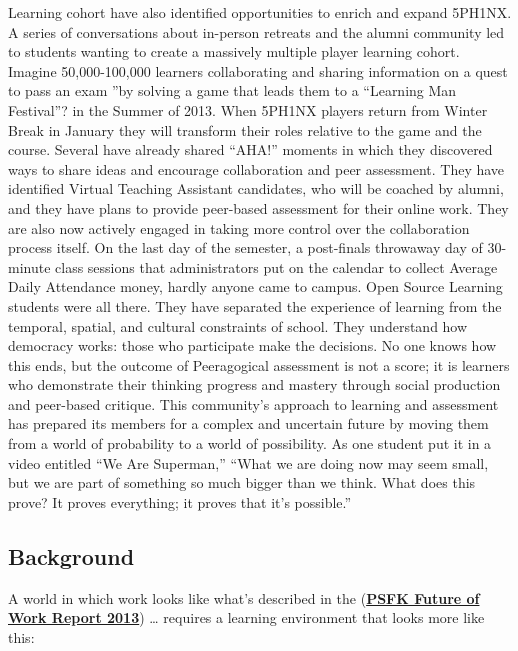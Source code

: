 Learning cohort have also identified opportunities to enrich and expand
5PH1NX. A series of conversations about in-person retreats and the
alumni community led to students wanting to create a massively multiple
player learning cohort. Imagine 50,000-100,000 learners collaborating
and sharing information on a quest to pass an exam ''by solving a game
that leads them to a ``Learning Man Festival''? in the Summer of 2013.
When 5PH1NX players return from Winter Break in January they will
transform their roles relative to the game and the course. Several have
already shared ``AHA!'' moments in which they discovered ways to share
ideas and encourage collaboration and peer assessment. They have
identified Virtual Teaching Assistant candidates, who will be coached by
alumni, and they have plans to provide peer-based assessment for their
online work. They are also now actively engaged in taking more control
over the collaboration process itself. On the last day of the semester,
a post-finals throwaway day of 30-minute class sessions that
administrators put on the calendar to collect Average Daily Attendance
money, hardly anyone came to campus. Open Source Learning students were
all there. They have separated the experience of learning from the
temporal, spatial, and cultural constraints of school. They understand
how democracy works: those who participate make the decisions. No one
knows how this ends, but the outcome of Peeragogical assessment is not a
score; it is learners who demonstrate their thinking progress and
mastery through social production and peer-based critique. This
community's approach to learning and assessment has prepared its members
for a complex and uncertain future by moving them from a world of
probability to a world of possibility. As one student put it in a video
entitled ``We Are Superman,'' ``What we are doing now may seem small,
but we are part of something so much bigger than we think. What does
this prove? It proves everything; it proves that it's possible.''

\subsection{Background}

A world in which work looks like what's described in the
(\textbf{\href{http://www.slideshare.net/PSFK/psfk-presents-future-of-work-report}{PSFK
    Future of Work Report 2013}}) \ldots{} requires a learning
environment that looks more like this:

